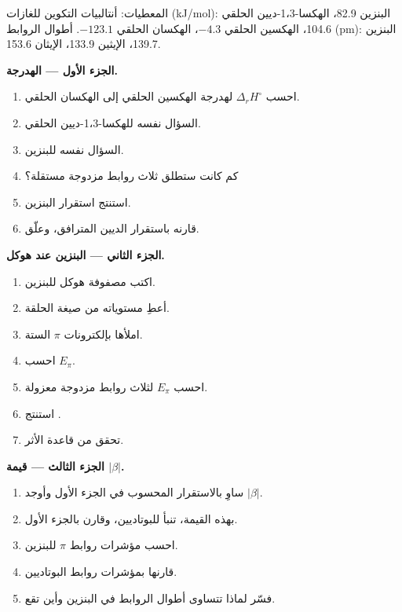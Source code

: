 \begin{problem}
\label{pb:b2:huckel:1}
المعطيات: أنتالبيات التكوين للغازات (\unit{kJ/mol}): البنزين 82.9،
الهكسا-1،3-ديين الحلقي 104.6، الهكسين الحلقي $-4.3$، الهكسان الحلقي $-123.1$. أطوال الروابط
(pm): البنزين 139.7، الإيثين 133.9، الإيثان 153.6.

\medskip
\noindent\textbf{الجزء الأول --- الهدرجة.}
\begin{enumerate}
  \item احسب $\Delta_r H^\circ$ لهدرجة الهكسين الحلقي إلى الهكسان الحلقي.
  \item السؤال نفسه للهكسا-1،3-ديين الحلقي.
  \item السؤال نفسه للبنزين.
  \item كم كانت ستطلق ثلاث روابط مزدوجة مستقلة؟
  \item استنتج استقرار البنزين.
  \item قارنه باستقرار الديين المترافق، وعلّق.
\end{enumerate}

\medskip
\noindent\textbf{الجزء الثاني --- البنزين عند هوكل.}
\begin{enumerate}[resume]
  \item اكتب مصفوفة هوكل للبنزين.
  \item أعطِ مستوياته من صيغة الحلقة.
  \item املأها بإلكترونات $\pi$ الستة.
  \item احسب $E_\pi$.
  \item احسب $E_\pi$ لثلاث روابط مزدوجة معزولة.
  \item استنتج .
  \item تحقق من قاعدة الأثر.
\end{enumerate}

\medskip
\noindent\textbf{الجزء الثالث --- قيمة $|\beta|$.}
\begin{enumerate}[resume]
  \item ساوِ  بالاستقرار المحسوب في الجزء الأول وأوجد
        $|\beta|$.
  \item بهذه القيمة، تنبأ  للبوتاديين، وقارن
        بالجزء الأول.
  \item احسب مؤشرات روابط $\pi$ للبنزين.
  \item قارنها بمؤشرات روابط البوتاديين.
  \item فسّر لماذا تتساوى أطوال الروابط في البنزين وأين تقع.
\end{enumerate}


\end{problem}
